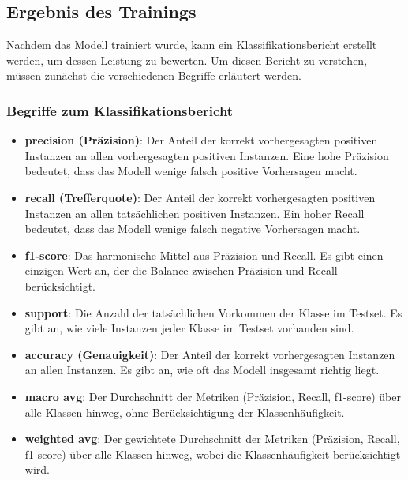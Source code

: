 \subsection{Ergebnis des Trainings}
Nachdem das Modell trainiert wurde, kann ein Klassifikationsbericht erstellt werden, um dessen Leistung zu bewerten. Um diesen Bericht zu verstehen, müssen zunächst die verschiedenen Begriffe erläutert werden.

\subsubsection{Begriffe zum Klassifikationsbericht}
\begin{itemize}
	\item \textbf{precision (Präzision)}: Der Anteil der korrekt vorhergesagten positiven Instanzen an allen vorhergesagten positiven Instanzen. Eine hohe Präzision bedeutet, dass das Modell wenige falsch positive Vorhersagen macht.
	\item \textbf{recall (Trefferquote)}: Der Anteil der korrekt vorhergesagten positiven Instanzen an allen tatsächlichen positiven Instanzen. Ein hoher Recall bedeutet, dass das Modell wenige falsch negative Vorhersagen macht.
	\item \textbf{f1-score}: Das harmonische Mittel aus Präzision und Recall. Es gibt einen einzigen Wert an, der die Balance zwischen Präzision und Recall berücksichtigt.
	\item \textbf{support}: Die Anzahl der tatsächlichen Vorkommen der Klasse im Testset. Es gibt an, wie viele Instanzen jeder Klasse im Testset vorhanden sind.
	\item \textbf{accuracy (Genauigkeit)}: Der Anteil der korrekt vorhergesagten Instanzen an allen Instanzen. Es gibt an, wie oft das Modell insgesamt richtig liegt.
	\item \textbf{macro \ac{avg}}: Der Durchschnitt der Metriken (Präzision, Recall, f1-score) über alle Klassen hinweg, ohne Berücksichtigung der Klassenhäufigkeit.
	\item \textbf{weighted avg}: Der gewichtete Durchschnitt der Metriken (Präzision, Recall, f1-score) über alle Klassen hinweg, wobei die Klassenhäufigkeit berücksichtigt wird.
\end{itemize}


